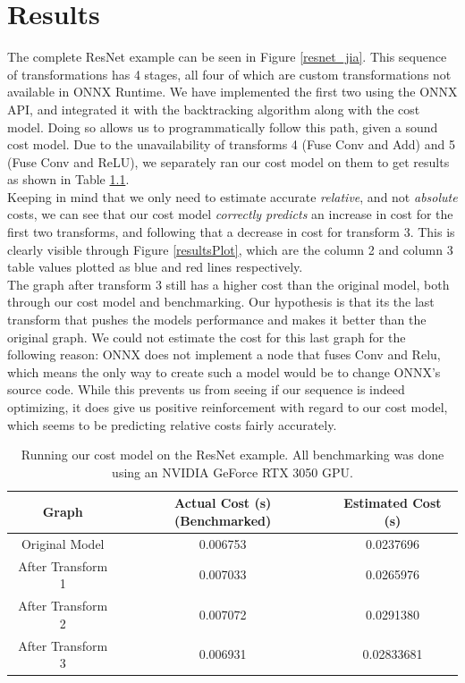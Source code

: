 \documentclass[12pt,a4paper,twoside,openright,bibliography=totocnumbered]{report}
\begin{document}
\chapter{Results}
The complete ResNet example can be seen in Figure \ref{resnet_jia}. This sequence of transformations has 4 stages, all four of which are custom transformations not available in ONNX Runtime. We have implemented the first two using the ONNX API, and integrated it with the backtracking algorithm along with the cost model. Doing so allows us to programmatically follow this path, given a sound cost model. Due to the unavailability of transforms 4 (Fuse Conv and Add) and 5 (Fuse Conv and ReLU), we separately ran our cost model on them to get results as shown in Table \ref{resultsTab}.\\
Keeping in mind that we only need to estimate accurate \textit{relative}, and not \textit{absolute} costs, we can see that our cost model \textit{correctly predicts} an increase in cost for the first two transforms, and following that a decrease in cost for transform 3. This is clearly visible through Figure \ref{resultsPlot}, which are the column 2 and column 3 table values plotted as blue and red lines respectively. \\
The graph after transform 3 still has a higher cost than the original model, both through our cost model and benchmarking. Our hypothesis is that its the last transform that pushes the models performance and makes it better than the original graph. We could not estimate the cost for this last graph for the following reason: ONNX does not implement a node that fuses Conv and Relu, which means the only way to create such a model would be to change ONNX's source code. While this prevents us from seeing if our sequence is indeed optimizing, it does give us positive reinforcement with regard to our cost model, which seems to be predicting relative costs fairly accurately. \\

\begin{table}
\centering
    \begin{tabular}{|c|c|c|}
        \hline
        Graph & Actual Cost (s) (Benchmarked) & Estimated Cost (s) \\
        \hline
        Original Model & 0.006753 & 0.0237696 \\
        After Transform 1 & 0.007033 & 0.0265976 \\
        After Transform 2 & 0.007072 & 0.0291380 \\
        After Transform 3 & 0.006931 & 0.02833681 \\
        \hline
    \end{tabular}
    \caption{Running our cost model on the ResNet example. All benchmarking was done using an NVIDIA GeForce RTX 3050 GPU.}
    \label{resultsTab}
\end{table}
\end{document}
